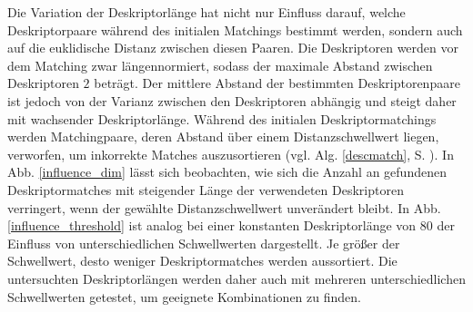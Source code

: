 Die Variation der Deskriptorlänge hat nicht nur Einfluss darauf, welche Deskriptorpaare während des initialen Matchings bestimmt werden, sondern auch auf die euklidische Distanz zwischen diesen Paaren. Die Deskriptoren werden vor dem Matching zwar längennormiert, sodass der maximale Abstand zwischen Deskriptoren $2$ beträgt. Der mittlere Abstand der bestimmten Deskriptorenpaare ist jedoch von der Varianz zwischen den Deskriptoren abhängig und steigt daher mit wachsender Deskriptorlänge. Während des initialen Deskriptormatchings werden Matchingpaare, deren Abstand über einem Distanzschwellwert liegen, verworfen, um inkorrekte Matches auszusortieren (vgl. Alg. \ref{descmatch}, S. \pageref{descmatch}). In Abb. \ref{influence_dim} lässt sich beobachten, wie sich die Anzahl an gefundenen Deskriptormatches mit steigender Länge der verwendeten Deskriptoren verringert, wenn der gewählte Distanzschwellwert unverändert bleibt. In Abb. \ref{influence_threshold} ist analog bei einer konstanten Deskriptorlänge von $80$ der Einfluss von unterschiedlichen Schwellwerten dargestellt. Je größer der Schwellwert, desto weniger Deskriptormatches werden aussortiert. Die untersuchten Deskriptorlängen werden daher auch mit mehreren unterschiedlichen Schwellwerten getestet, um geeignete Kombinationen zu finden. 


